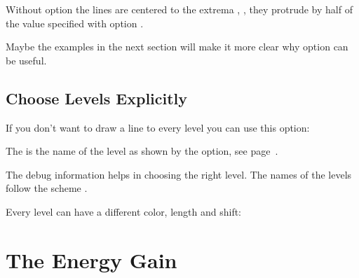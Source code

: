 \documentclass[load-preamble+]{cnltx-doc}
\begin{document}
Without option  the lines are centered to the extrema , \ie,
they protrude by half of the value specified with option .
\begin{example}
  \begin{endiagram}
    \ShowNiveaus[shift=.5]
  \end{endiagram}
  \quad
  \begin{endiagram}
    \ShowNiveaus[length=2,shift=1]
  \end{endiagram}
\end{example}
Maybe the examples in the next section will make it more clear why option
 can be useful.

\subsection{Choose Levels Explicitly}

If you don't want to draw a line to every level you can use this option:
\begin{options}
    The  is the name of the level as shown by the 
    option, see page~\pageref{key:debug}.
\end{options}

The debug information helps in choosing the right level.  The names of the
levels follow the scheme .
\begin{example}
  \begin{endiagram}[debug]
  \end{endiagram}
  \quad
  \begin{endiagram}
    \ShowNiveaus[niveau=N1-2]
  \end{endiagram}
\end{example}

Every level can have a different color, length and shift:
\begin{example}
  \begin{endiagram}
    \ShowNiveaus[length=2,tikz=red,niveau=N1-2]
    \ShowNiveaus[niveau=N1-1,shift=-.5]
    \ShowNiveaus[niveau=N1-3,shift=.5]
  \end{endiagram}
\end{example}

\section{The Energy Gain}
\end{document}
